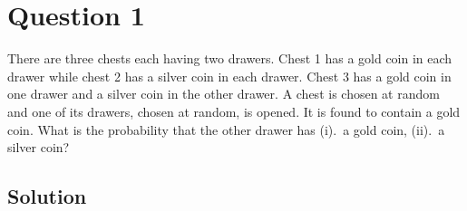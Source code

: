 \section*{Question 1}

There are three chests each having two drawers.
Chest 1 has a gold coin in each drawer while chest 2 has a silver coin in each drawer.
Chest 3 has a gold coin in one drawer and a silver coin in the other drawer.
A chest is chosen at random and one of its drawers, chosen at random, is opened.
It is found to contain a gold coin.
What is the probability that the other drawer has (i).\ a gold coin, (ii).\ a silver coin?

\subsection*{Solution}
